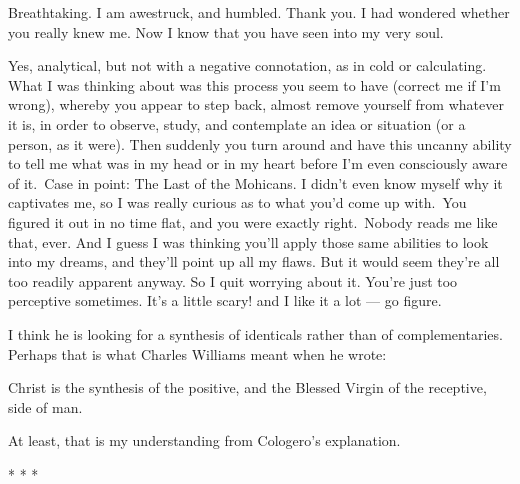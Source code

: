 \begin{quotex}
Breathtaking. I am awestruck, and humbled. Thank you. I had wondered whether you really knew me. Now I know that you have seen into my very soul.

Yes, analytical, but not with a negative connotation, as in cold or calculating. What I was thinking about was this process you seem to have (correct me if I'm wrong), whereby you appear to step back, almost remove yourself from whatever it is, in order to observe, study, and contemplate an idea or situation (or a person, as it were). Then suddenly you turn around and have this uncanny ability to tell me what was in my head or in my heart before I'm even consciously aware of it. Case in point: The Last of the Mohicans. I didn't even know myself why it captivates me, so I was really curious as to what you'd come up with. You figured it out in no time flat, and you were exactly right. Nobody reads me like that, ever. And I guess I was thinking you'll apply those same abilities to look into my dreams, and they'll point up all my flaws. But it would seem they're all too readily apparent anyway. So I quit worrying about it. You're just too perceptive sometimes. It's a little scary! and I like it a lot — go figure. 

\end{quotex}
I think he is looking for a synthesis of identicals rather than of complementaries. Perhaps that is what Charles Williams meant when he wrote:

\begin{quotex}
Christ is the synthesis of the positive, and the Blessed Virgin of the receptive, side of man. 

\end{quotex}
At least, that is my understanding from Cologero's explanation.




\begin{center}* * *\end{center}

